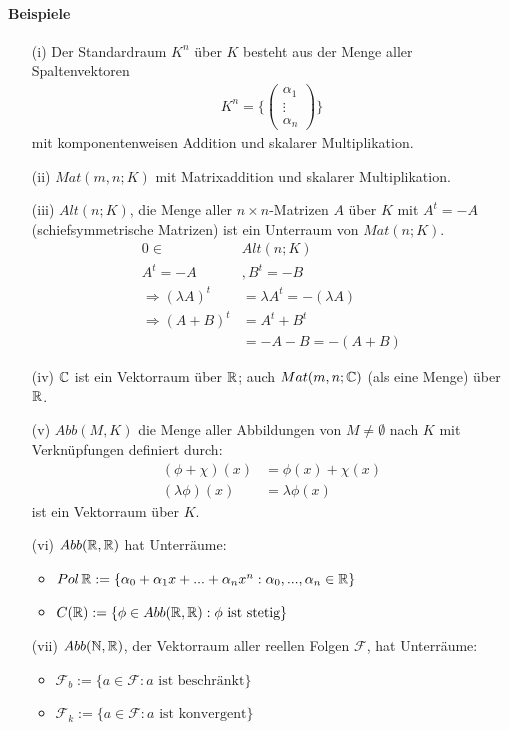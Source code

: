 \paragraph{Beispiele}
\begin{itemize}
 \item[(i)] Der Standardraum $K^n$ über $K$ besteht aus der Menge aller Spaltenvektoren
\begin{align}
K^n = \{ \begin{pmatrix} \alpha_1 \\ \vdots \\ \alpha_n \end{pmatrix}\}
\end{align}
mit komponentenweisen Addition und skalarer Multiplikation.
\item[(ii)] $Mat(m,n;K)$ mit Matrixaddition und skalarer Multiplikation.
\item[(iii)] $Alt(n;K)$, die Menge aller $n\times n$-Matrizen $A$ über $K$ mit $A^t = -A$ (schiefsymmetrische Matrizen) ist ein Unterraum von $Mat(n;K)$.
\begin{align}
0 \in &Alt(n;K) \\
A^t = -A &, B^t = -B \\
\Rightarrow (\lambda A)^t &= \lambda A^t = -(\lambda A) \\
\Rightarrow (A+B)^t &= A^t + B^t \\
&= - A - B = - (A+B)
\end{align}
\item[(iv)] $\mathbb{C}$ ist ein Vektorraum über $\mathbb{R}$; auch $Mat(m,n;\mathbb{C})$ (als eine Menge) über $\mathbb{R}$.
\item[(v)] $Abb(M,K)$ die Menge aller Abbildungen von $M \neq \emptyset$ nach $K$ mit Verknüpfungen definiert durch:
\begin{align}
(\phi + \chi)(x) &= \phi(x) + \chi(x) \\
(\lambda \phi)(x) &= \lambda \phi(x)
\end{align}
ist ein Vektorraum über $K$.
\item[(vi)] $Abb(\mathbb{R}, \mathbb{R})$ hat Unterräume:
\begin{itemize}
\item $Pol\, \mathbb{R} := \{\alpha_0 +\alpha_1 x + ... + \alpha_n x^n: \alpha_0, ..., \alpha_n \in \mathbb{R}\}$
\item $C(\mathbb{R}) := \{\phi \in Abb(\mathbb{R}, \mathbb{R}): \phi \text{ ist stetig}\}$
\end{itemize}
\item[(vii)] $Abb(\mathbb{N}, \mathbb{R})$, der Vektorraum aller reellen Folgen $\mathcal{F}$, hat Unterräume:
\begin{itemize}
\item $\mathcal{F}_b := \{a \in \mathcal{F}: a \text{ ist beschränkt}\}$
\item $\mathcal{F}_k := \{a \in \mathcal{F}: a \text{ ist konvergent}\}$
\end{itemize}
\end{itemize}
